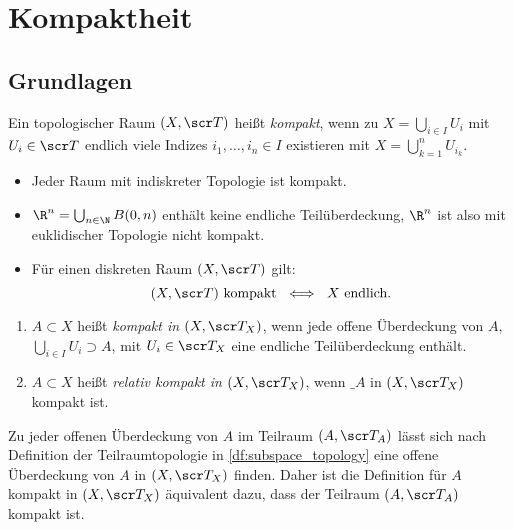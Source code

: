 \chapter{Kompaktheit}



\section{Grundlagen}


\begin{df}
	Ein topologischer Raum $(X, \scr T)$ heißt \emph{kompakt}, wenn zu $X = \bigcup_{i\in I} U_i$ mit $U_i \in \scr T$ endlich viele Indizes $i_1, \dotsc, i_n \in I$ existieren mit $X = \bigcup_{k=1}^n U_{i_k}$.
\end{df}

\begin{ex}
	\begin{itemize}
		\item
			Jeder Raum mit indiskreter Topologie ist kompakt.
		\item
			$\R^n = \bigcup_{n\in\N} B(0,n)$ enthält keine endliche Teilüberdeckung, $\R^n$ ist also mit euklidischer Topologie nicht kompakt.
		\item
			Für einen diskreten Raum $(X, \scr T)$ gilt:
			\[
				(X, \scr T) \text{ kompakt }
				\iff
				\text{ $X$ endlich}.
			\]
	\end{itemize}
\end{ex}

\begin{df}
	\begin{enumerate}[(1)]
		\item
			$A \subset X$ heißt \emph{kompakt in $(X, \scr T_X)$}, wenn jede offene Überdeckung von $A$, $\bigcup_{i\in I} U_i \supset A$, mit $U_i \in \scr T_X$ eine endliche Teilüberdeckung enthält.
		\item
			$A \subset X$ heißt \emph{relativ kompakt in $(X, \scr T_X)$}, wenn $\_A$ in $(X, \scr T_X)$ kompakt ist.
	\end{enumerate}
	\begin{note}
		Zu jeder offenen Überdeckung von $A$ im Teilraum $(A, \scr T_A)$ lässt sich nach Definition der Teilraumtopologie in \ref{df:subspace_topology} eine offene Überdeckung von $A$ in $(X, \scr T_X)$ finden.
		Daher ist die Definition für $A$ kompakt in $(X, \scr T_X)$ äquivalent dazu, dass der Teilraum $(A, \scr T_A)$ kompakt ist.
	\end{note}
\end{df}


